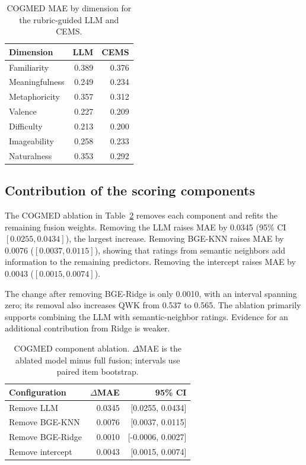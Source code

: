\begin{table}[t]
\centering
\small
\setlength{\tabcolsep}{5pt}
\caption{COGMED MAE by dimension for the rubric-guided LLM and CEMS.}
\label{tab:dimension_mae}
\begin{tabular}{lrr}
\toprule
Dimension & LLM & CEMS\\
\midrule
Familiarity & 0.389 & 0.376\\
Meaningfulness & 0.249 & 0.234\\
Metaphoricity & 0.357 & 0.312\\
Valence & 0.227 & 0.209\\
Difficulty & 0.213 & 0.200\\
Imageability & 0.258 & 0.233\\
Naturalness & 0.353 & 0.292\\
\bottomrule
\end{tabular}
\end{table}

\subsection{Contribution of the scoring components}

The COGMED ablation in Table~\ref{tab:ablation} removes each component and refits the remaining fusion weights. Removing the LLM raises MAE by 0.0345 (95\% CI $[0.0255,0.0434]$), the largest increase. Removing BGE-KNN raises MAE by 0.0076 ($[0.0037,0.0115]$), showing that ratings from semantic neighbors add information to the remaining predictors. Removing the intercept raises MAE by 0.0043 ($[0.0015,0.0074]$).

The change after removing BGE-Ridge is only 0.0010, with an interval spanning zero; its removal also increases QWK from 0.537 to 0.565. The ablation primarily supports combining the LLM with semantic-neighbor ratings. Evidence for an additional contribution from Ridge is weaker.

\begin{table}[t]
\centering
\small
\caption{COGMED component ablation. $\Delta$MAE is the ablated model minus full fusion; intervals use paired item bootstrap.}
\label{tab:ablation}
\begin{tabular}{lrr}
\toprule
Configuration & $\Delta$MAE & 95\% CI\\
\midrule
Remove LLM & 0.0345 & [0.0255, 0.0434]\\
Remove BGE-KNN & 0.0076 & [0.0037, 0.0115]\\
Remove BGE-Ridge & 0.0010 & [-0.0006, 0.0027]\\
Remove intercept & 0.0043 & [0.0015, 0.0074]\\
\bottomrule
\end{tabular}
\end{table}

